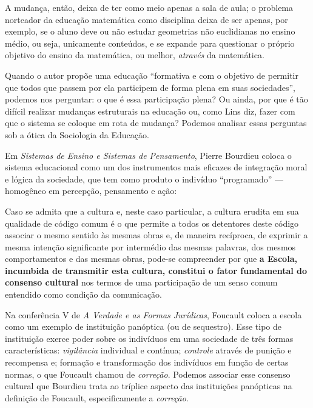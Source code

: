 \documentclass[
  12pt,
  letterpaper,
  DIV=11,
  numbers=noendperiod]{scrartcl}
\newenvironment{citacao}
    {\begin{quoting}[rightmargin=0cm,leftmargin=4cm]
    \begin{singlespace}
    \footnotesize
    }
    {\end{singlespace}
    \end{quoting}
}
\begin{document}
A mudança, então, deixa de ter como meio apenas a sala de aula; o
problema norteador da educação matemática como disciplina deixa de ser
apenas, por exemplo, se o aluno deve ou não estudar geometrias não
euclidianas no ensino médio, ou seja, unicamente conteúdos, e se expande
para questionar o próprio objetivo do ensino da matemática, ou melhor,
\emph{através} da matemática.

Quando o autor propõe uma educação ``formativa e com o objetivo de
permitir que todos que passem por ela participem de forma plena em suas
sociedades'', podemos nos perguntar: o que é essa participação plena? Ou
ainda, por que é tão difícil realizar mudanças estruturais na educação
ou, como Lins diz, fazer com que o sistema se coloque em rota de
mudança? Podemos analisar essas perguntas sob a ótica da Sociologia da
Educação.

Em \emph{Sistemas de Ensino e Sistemas de Pensamento}, Pierre Bourdieu
coloca o sistema educacional como um dos instrumentos mais eficazes de
integração moral e lógica da sociedade, que tem como produto o indivíduo
``programado'' --- homogêneo em percepção, pensamento e ação:

\begin{citacao}
Caso se admita que a cultura e, neste caso particular, a cultura erudita em sua qualidade de código comum é o que permite a todos os detentores deste código associar o mesmo sentido às mesmas obras e, de maneira recíproca, de exprimir a mesma intenção significante por intermédio das mesmas palavras, dos mesmos comportamentos e das mesmas obras, pode-se compreender por que \textbf{a Escola, incumbida de transmitir esta cultura, constitui o fator fundamental do consenso cultural} nos termos de uma participação de um senso comum entendido como condição da comunicação. \citep{bourdieu}
\end{citacao}

Na conferência V de \emph{A Verdade e as Formas Jurídicas}, Foucault
coloca a escola como um exemplo de instituição panóptica (ou de
sequestro). Esse tipo de instituição exerce poder sobre os indivíduos em
uma sociedade de três formas características: \emph{vigilância}
individual e contínua; \emph{controle} através de punição e recompensa
e; formação e transformação dos indivíduos em função de certas normas, o
que Foucault chamou de \emph{correção}. Podemos associar esse consenso
cultural que Bourdieu trata ao tríplice aspecto das instituições
panópticas na definição de Foucault, especificamente a \emph{correção}.
\end{document}
